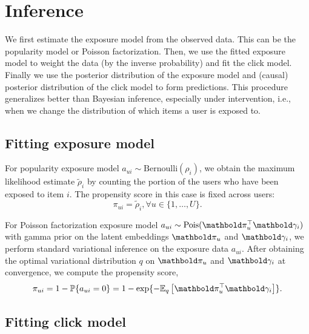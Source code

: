 \section{Inference}  \label{chpt:causal_rec:sec:inference}

We first estimate the exposure model from
the observed data.  This can be the popularity model or Poisson
factorization.  Then, we use the fitted exposure model to weight the
data (by the inverse probability) and fit the click model.  Finally we
use the posterior distribution of the exposure model and (causal)
posterior distribution of the click model to form predictions.  This
procedure generalizes better than Bayesian inference, especially under
intervention, i.e., when we change the distribution of which items a
user is exposed to.

\subsection{Fitting exposure model}

 For popularity exposure model $a_{ui} \sim \mathrm{Bernoulli}(\rho_i)$, we obtain the maximum likelihood estimate $\tilde{\rho}_i$ by counting the portion of the users who have been exposed to item $i$. The propensity score in this case is fixed across users: 
\begin{equation}
\pi_{ui} = \tilde\rho_i, \forall u \in \{1, \dots, U\}.
\label{chpt:causal_rec:eq:pop_prop}
\end{equation}


 For Poisson factorization exposure model $a_{ui} \sim \pois(\mb\pi_u^\top \mb\gamma_i)$ with gamma prior on the latent embeddings $\mb\pi_u$ and $\mb\gamma_i$, we perform standard variational inference \citep{Gopalan:2015} on the exposure data $a_{ui}$. After obtaining the optimal variational distribution $q$ on $\mb\pi_u$ and $\mb\gamma_i$ at convergence, we compute the propensity score,
\begin{equation}
\pi_{ui} = 1 - \mathbb{P}\{a_{ui} = 0\} = 1 - \exp\{-\EE{q}{\mb\pi_u^\top\mb\gamma_i}\}.
\label{chpt:causal_rec:eq:pf_prop}
\end{equation}

\subsection{Fitting click model}

